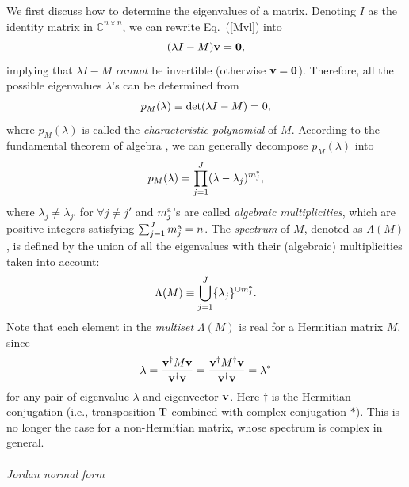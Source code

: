 \documentclass{tADP2e}
\theoremstyle{plain}
\theoremstyle{plain}
\theoremstyle{definition}
\begin{document}
We first discuss how to determine the eigenvalues of a matrix. Denoting $I$ as the identity matrix in $\mathbb{C}^{n\times n}$, we can rewrite Eq.~(\ref{Mvl}) into 
\begin{equation}
(\lambda I-M)\bold{v}=\bold{0}, 
\end{equation}
implying that $\lambda I-M$ \emph{cannot} be invertible (otherwise $\bold{v}=\bold{0}$). Therefore, all the possible eigenvalues $\lambda$'s can be determined from
\begin{equation}
p_M(\lambda)\equiv {\rm det}(\lambda I-M)=0,
\label{pM}
\end{equation}
where $p_M(\lambda)$ is called the \emph{characteristic polynomial} of $M$. According to the fundamental theorem of algebra \cite{LVA79}, we can generally decompose $p_M(\lambda)$ into
\begin{equation}
p_M(\lambda)=\prod^J_{j=1}(\lambda-\lambda_j)^{m^{\rm a}_j},
\end{equation}
where $\lambda_{j}\neq\lambda_{j'}$ for $\forall j\neq j'$ and $m^{\rm a}_j$'s are called \emph{algebraic multiplicities}, which are positive integers satisfying $\sum^J_{j=1}m^{\rm a}_j=n$. The {\emph{spectrum}} of $M$, denoted as $\Lambda(M)$, is defined by the union of all the eigenvalues with their (algebraic) multiplicities taken into account:
\begin{equation}
\Lambda(M)\equiv\bigcup^J_{j=1}\{\lambda_j\}^{\cup m^{\rm a}_j}.
\end{equation}
Note that each element in the \emph{multiset} $\Lambda(M)$ is real for a Hermitian matrix $M$, since 
\begin{equation}
\lambda=\frac{\bold{v}^\dag M\bold{v}}{\bold{v}^\dag\bold{v}}=\frac{\bold{v}^\dag M^\dag\bold{v}}{\bold{v}^\dag\bold{v}}=\lambda^*
\label{lamreal}
\end{equation}
for any pair of eigenvalue $\lambda$ and eigenvector $\bold{v}$. Here $\dag$ is the Hermitian conjugation (i.e., transposition $\rm T$ combined with complex conjugation $*$). This is no longer the case for a non-Hermitian matrix, whose spectrum is complex in general.
\\
\\
{\it Jordan normal form}
\end{document}
